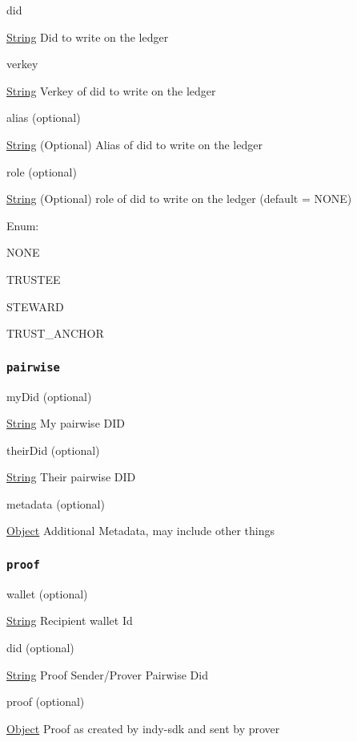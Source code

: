 did

{\protect\hyperlink{string}{String}} Did to write on the ledger

verkey

{\protect\hyperlink{string}{String}} Verkey of did to write on the
ledger

alias (optional)

{\protect\hyperlink{string}{String}} (Optional) Alias of did to write on
the ledger

role (optional)

{\protect\hyperlink{string}{String}} (Optional) role of did to write on
the ledger (default = NONE)

Enum:

NONE

TRUSTEE

STEWARD

TRUST\_ANCHOR

\hypertarget{pairwise}{%
\subsubsection{\texorpdfstring{\protect\hypertarget{pairwise}{}{\texttt{pairwise}}}{pairwise}}\label{pairwise}}

myDid (optional)

{\protect\hyperlink{string}{String}} My pairwise DID

theirDid (optional)

{\protect\hyperlink{string}{String}} Their pairwise DID

metadata (optional)

{\protect\hyperlink{object}{Object}} Additional Metadata, may include
other things

\hypertarget{proof-2}{%
\subsubsection{\texorpdfstring{\protect\hypertarget{proof}{}{\texttt{proof}}}{proof}}\label{proof-2}}

wallet (optional)

{\protect\hyperlink{string}{String}} Recipient wallet Id

did (optional)

{\protect\hyperlink{string}{String}} Proof Sender/Prover Pairwise Did

proof (optional)

{\protect\hyperlink{object}{Object}} Proof as created by indy-sdk and
sent by prover

